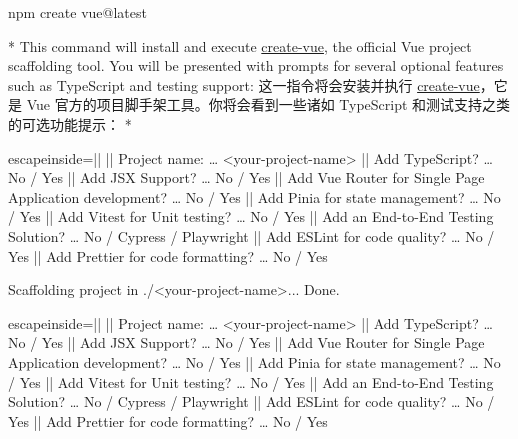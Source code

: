 \begin{paracol}{2}
\begin{codeShell}
\end{codeShell}
\switchcolumn
\begin{codeShell}
npm create vue@latest
\end{codeShell}
\switchcolumn[0]*%
This command will install and execute
\href{https://github.com/vuejs/create-vue}{create-vue}, the official Vue
project scaffolding tool. You will be presented with prompts for several
optional features such as TypeScript and testing support:
\switchcolumn
这一指令将会安装并执行
\href{https://github.com/vuejs/create-vue}{create-vue}，它是 Vue
官方的项目脚手架工具。你将会看到一些诸如 TypeScript
和测试支持之类的可选功能提示：
\switchcolumn[0]*%
\begin{codeConsole*}{escapeinside=||}
|\checkmark| Project name: … <your-project-name>
|\checkmark| Add TypeScript? … No / Yes
|\checkmark| Add JSX Support? … No / Yes
|\checkmark| Add Vue Router for Single Page Application development? … No / Yes
|\checkmark| Add Pinia for state management? … No / Yes
|\checkmark| Add Vitest for Unit testing? … No / Yes
|\checkmark| Add an End-to-End Testing Solution? … No / Cypress / Playwright
|\checkmark| Add ESLint for code quality? … No / Yes
|\checkmark| Add Prettier for code formatting? … No / Yes

Scaffolding project in ./<your-project-name>...
Done.
\end{codeConsole*}
\switchcolumn
\begin{codeConsole*}{escapeinside=||}
|\checkmark| Project name: … <your-project-name>
|\checkmark| Add TypeScript? … No / Yes
|\checkmark| Add JSX Support? … No / Yes
|\checkmark| Add Vue Router for Single Page Application development? … No / Yes
|\checkmark| Add Pinia for state management? … No / Yes
|\checkmark| Add Vitest for Unit testing? … No / Yes
|\checkmark| Add an End-to-End Testing Solution? … No / Cypress / Playwright
|\checkmark| Add ESLint for code quality? … No / Yes
|\checkmark| Add Prettier for code formatting? … No / Yes


\end{codeConsole*}
\end{paracol}
